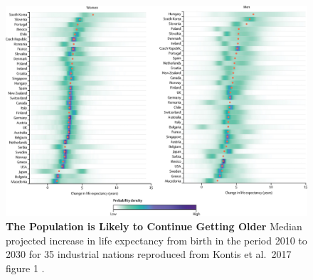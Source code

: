 \documentclass[
]{book}
\begin{document}
\begin{figure}

{\centering \includegraphics[width=0.95\linewidth]{figs/Kontis2017_fig1} 

}

\caption{\textbf{The Population is Likely to Continue Getting Older} Median projected increase in life expectancy from birth in the period 2010 to 2030 for 35 industrial nations reproduced from Kontis et al.~2017 figure 1 \citep{Kontis2017}.}\label{fig:Kontis2017-fig1}
\end{figure}
\end{document}
